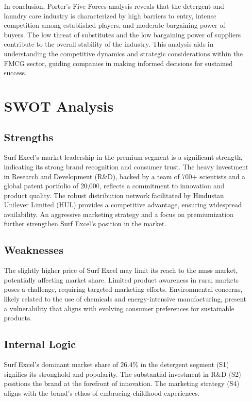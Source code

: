 In conclusion, Porter's Five Forces analysis reveals that the detergent and laundry care industry is characterized by high barriers to entry, intense competition among established players, and moderate bargaining power of buyers. The low threat of substitutes and the low bargaining power of suppliers contribute to the overall stability of the industry. This analysis aids in understanding the competitive dynamics and strategic considerations within the FMCG sector, guiding companies in making informed decisions for sustained success.
\section{SWOT Analysis}

\subsection{Strengths}

Surf Excel's market leadership in the premium segment is a significant strength, indicating its strong brand recognition and consumer trust. The heavy investment in Research and Development (R\&D), backed by a team of 700+ scientists and a global patent portfolio of 20,000, reflects a commitment to innovation and product quality. The robust distribution network facilitated by Hindustan Unilever Limited (HUL) provides a competitive advantage, ensuring widespread availability. An aggressive marketing strategy and a focus on premiumization further strengthen Surf Excel's position in the market.

\subsection{Weaknesses}

The slightly higher price of Surf Excel may limit its reach to the mass market, potentially affecting market share. Limited product awareness in rural markets poses a challenge, requiring targeted marketing efforts. Environmental concerns, likely related to the use of chemicals and energy-intensive manufacturing, present a vulnerability that aligns with evolving consumer preferences for sustainable products.

\subsection{Internal Logic}

Surf Excel's dominant market share of 26.4\% in the detergent segment (S1) signifies its stronghold and popularity. The substantial investment in R\&D (S2) positions the brand at the forefront of innovation. The marketing strategy (S4) aligns with the brand's ethos of embracing childhood experiences.

